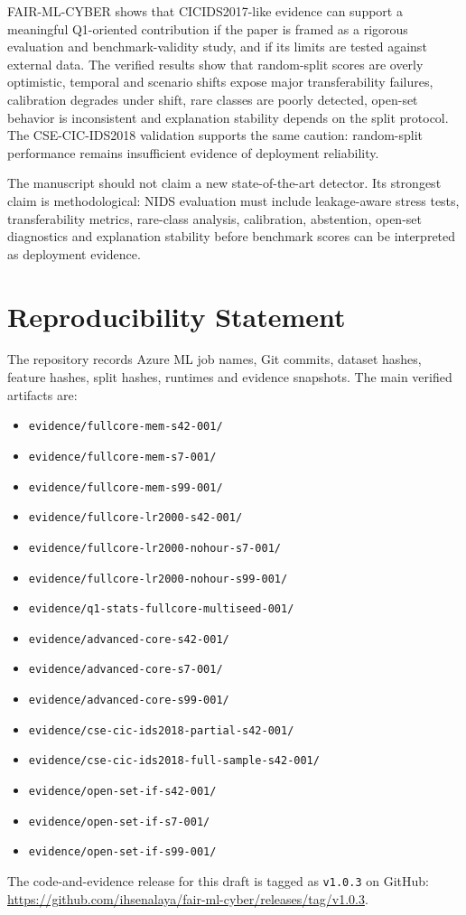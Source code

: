 \documentclass[11pt,a4paper]{article}
\begin{document}
FAIR-ML-CYBER shows that CICIDS2017-like evidence can support a meaningful Q1-oriented contribution if the paper is framed as a rigorous evaluation and benchmark-validity study, and if its limits are tested against external data. The verified results show that random-split scores are overly optimistic, temporal and scenario shifts expose major transferability failures, calibration degrades under shift, rare classes are poorly detected, open-set behavior is inconsistent and explanation stability depends on the split protocol. The CSE-CIC-IDS2018 validation supports the same caution: random-split performance remains insufficient evidence of deployment reliability.

The manuscript should not claim a new state-of-the-art detector. Its strongest claim is methodological: NIDS evaluation must include leakage-aware stress tests, transferability metrics, rare-class analysis, calibration, abstention, open-set diagnostics and explanation stability before benchmark scores can be interpreted as deployment evidence.

\section*{Reproducibility Statement}

The repository records Azure ML job names, Git commits, dataset hashes, feature hashes, split hashes, runtimes and evidence snapshots. The main verified artifacts are:
\begin{itemize}[leftmargin=*]
  \item \texttt{evidence/fullcore-mem-s42-001/}
  \item \texttt{evidence/fullcore-mem-s7-001/}
  \item \texttt{evidence/fullcore-mem-s99-001/}
  \item \texttt{evidence/fullcore-lr2000-s42-001/}
  \item \texttt{evidence/fullcore-lr2000-nohour-s7-001/}
  \item \texttt{evidence/fullcore-lr2000-nohour-s99-001/}
  \item \texttt{evidence/q1-stats-fullcore-multiseed-001/}
  \item \texttt{evidence/advanced-core-s42-001/}
  \item \texttt{evidence/advanced-core-s7-001/}
  \item \texttt{evidence/advanced-core-s99-001/}
  \item \texttt{evidence/cse-cic-ids2018-partial-s42-001/}
  \item \texttt{evidence/cse-cic-ids2018-full-sample-s42-001/}
  \item \texttt{evidence/open-set-if-s42-001/}
  \item \texttt{evidence/open-set-if-s7-001/}
  \item \texttt{evidence/open-set-if-s99-001/}
\end{itemize}

The code-and-evidence release for this draft is tagged as \texttt{v1.0.3} on GitHub:
\url{https://github.com/ihsenalaya/fair-ml-cyber/releases/tag/v1.0.3}.



\end{document}
